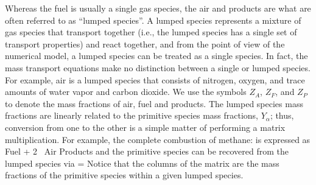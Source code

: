 Whereas the fuel is usually a single gas species, the air and products are what are often referred to as ``lumped species''. A lumped species represents a mixture of gas species that transport together (i.e., the lumped species has a single set of transport properties) and react together, and from the point of view of the numerical model, a lumped species can be treated as a single species. In fact, the mass transport equations make no distinction between a single or lumped species. For example, air is a lumped species that consists of nitrogen, oxygen, and trace amounts of water vapor and carbon dioxide. We use the symbols $Z_A$, $Z_F$, and $Z_P$ to denote the mass fractions of air, fuel and products.  The lumped species mass fractions are linearly related to the primitive species mass fractions, $Y_\alpha$; thus, conversion from one to the other is a simple matter of performing a matrix multiplication.  For example, the complete combustion of methane:
\be {} \ee
is expressed as
\be \hbox{Fuel} + 2 \, \hbox{Air} \rightarrow \hbox{Products} \ee
and the primitive species can be recovered from the lumped species via
\be \left[ \begin{array} {c c c}
0.77 & 0.00 & 0.73 \\
0.23 & 0.00 & 0.00 \\
0.00 & 1.00 & 0.00 \\
0.00 & 0.00 & 0.15 \\
0.00 & 0.00 & 0.12  \end{array}
\right]
\left[ \begin{array} {c} Z_{\rm A} \\ Z_{\rm F} \\ Z_{\rm P} \end{array} \right] =
 \ee
Notice that the columns of the matrix are the mass fractions of the primitive species within a given lumped species.

